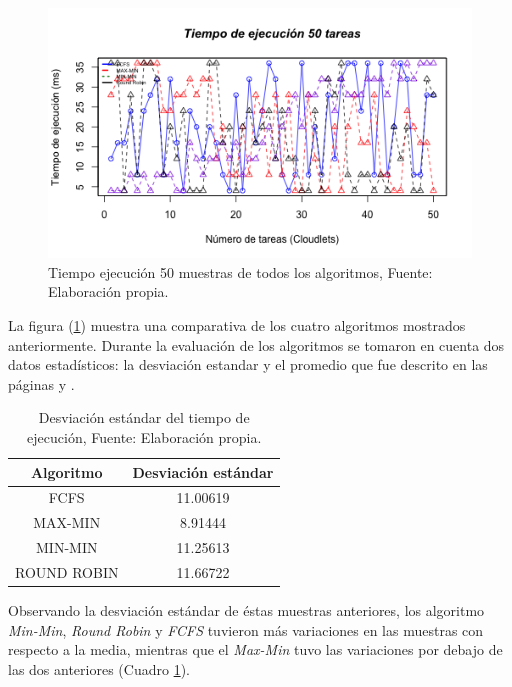 \newpage




\renewcommand\thefigure{\arabic{figure}}
\begin{figure}[h!] 
	\centering
	\includegraphics[scale=0.7]{media/figure}
	\caption{Tiempo ejecuci\'on 50 muestras de todos los algoritmos, Fuente: Elaboraci\'on propia.}
	\label{fig:figure}
\end{figure}

La figura (\ref{fig:figure}) muestra una comparativa de los cuatro algoritmos mostrados anteriormente. Durante la evaluación de los algoritmos se tomaron en cuenta dos datos estadísticos: la desviación estandar y el promedio que fue descrito en las páginas \pageref{etiqueta} y \pageref{etiqueta2}.



\renewcommand\thetable{\arabic{table}}
\begin{table}[h!]
	\centering
	\begin{tabular}{@{}cc@{}}
		\toprule
		{\bf Algoritmo} & \multicolumn{1}{l}{{\bf Desviaci\'on est\'andar}} \\ \midrule
		FCFS & 11.00619 \\
		MAX-MIN & 8.91444 \\
		MIN-MIN & 11.25613 \\ 
		ROUND ROBIN & 11.66722 \\ \bottomrule
		
	\end{tabular}
	\caption{Desviaci\'on est\'andar del tiempo de ejecuci\'on, Fuente: Elaboraci\'on propia.}
	\label{tiempotabla}
\end{table}

Observando la desviaci\'on est\'andar de \'estas muestras anteriores, los algoritmo \textit{Min-Min}, \textit{Round Robin} y \textit{FCFS} tuvieron m\'as variaciones en las muestras con respecto a la media, mientras que el \textit{Max-Min} tuvo las variaciones por debajo de las dos anteriores (Cuadro \ref{tiempotabla}).
